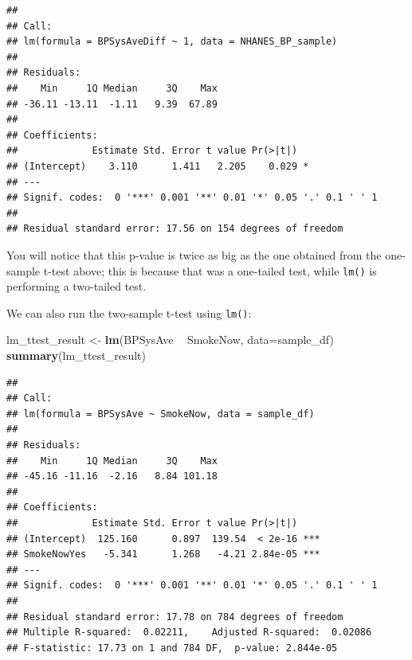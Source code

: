 \documentclass[12pt,]{book}
\newenvironment{Shaded}{\begin{snugshade}}{\end{snugshade}}
\newcommand{\DataTypeTok}[1]{\textcolor[rgb]{0.13,0.29,0.53}{#1}}
\newcommand{\DecValTok}[1]{\textcolor[rgb]{0.00,0.00,0.81}{#1}}
\newcommand{\KeywordTok}[1]{\textcolor[rgb]{0.13,0.29,0.53}{\textbf{#1}}}
\newcommand{\NormalTok}[1]{#1}
\newcommand{\OperatorTok}[1]{\textcolor[rgb]{0.81,0.36,0.00}{\textbf{#1}}}
\newcommand{\StringTok}[1]{\textcolor[rgb]{0.31,0.60,0.02}{#1}}
\begin{document}
\begin{Shaded}
\end{Shaded}

\begin{verbatim}
## 
## Call:
## lm(formula = BPSysAveDiff ~ 1, data = NHANES_BP_sample)
## 
## Residuals:
##    Min     1Q Median     3Q    Max 
## -36.11 -13.11  -1.11   9.39  67.89 
## 
## Coefficients:
##             Estimate Std. Error t value Pr(>|t|)  
## (Intercept)    3.110      1.411   2.205    0.029 *
## ---
## Signif. codes:  0 '***' 0.001 '**' 0.01 '*' 0.05 '.' 0.1 ' ' 1
## 
## Residual standard error: 17.56 on 154 degrees of freedom
\end{verbatim}

You will notice that this p-value is twice as big as the one obtained from the one-sample t-test above; this is because that was a one-tailed test, while \texttt{lm()} is performing a two-tailed test.

We can also run the two-sample t-test using \texttt{lm()}:

\begin{Shaded}
\begin{Highlighting}[]
\NormalTok{lm_ttest_result <-}\StringTok{ }\KeywordTok{lm}\NormalTok{(BPSysAve }\OperatorTok{~}\StringTok{ }\NormalTok{SmokeNow, }\DataTypeTok{data=}\NormalTok{sample_df)}
\KeywordTok{summary}\NormalTok{(lm_ttest_result)}
\end{Highlighting}
\end{Shaded}

\begin{verbatim}
## 
## Call:
## lm(formula = BPSysAve ~ SmokeNow, data = sample_df)
## 
## Residuals:
##    Min     1Q Median     3Q    Max 
## -45.16 -11.16  -2.16   8.84 101.18 
## 
## Coefficients:
##             Estimate Std. Error t value Pr(>|t|)    
## (Intercept)  125.160      0.897  139.54  < 2e-16 ***
## SmokeNowYes   -5.341      1.268   -4.21 2.84e-05 ***
## ---
## Signif. codes:  0 '***' 0.001 '**' 0.01 '*' 0.05 '.' 0.1 ' ' 1
## 
## Residual standard error: 17.78 on 784 degrees of freedom
## Multiple R-squared:  0.02211,    Adjusted R-squared:  0.02086 
## F-statistic: 17.73 on 1 and 784 DF,  p-value: 2.844e-05
\end{verbatim}
\end{document}
